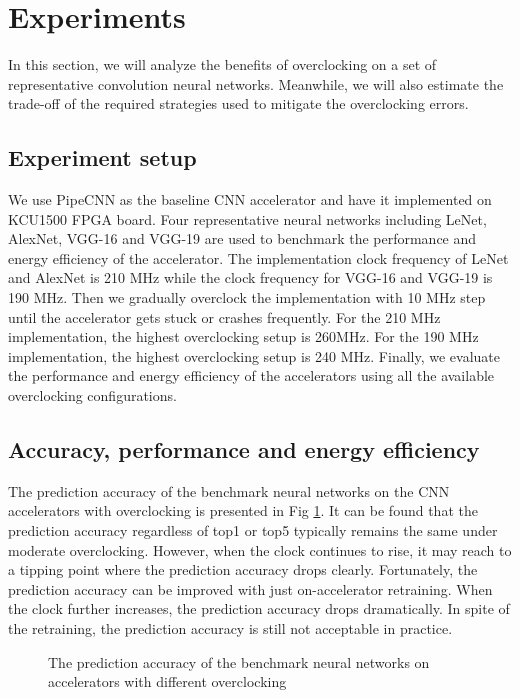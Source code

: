 \section{Experiments}
In this section, we will analyze the benefits of 
overclocking on a set of representative convolution neural networks.
Meanwhile, we will also estimate the trade-off of the required strategies 
used to mitigate the overclocking errors.

\subsection{Experiment setup}
We use PipeCNN as the baseline CNN accelerator and have it implemented on KCU1500 FPGA board.
Four representative neural networks including LeNet, AlexNet, VGG-16 and VGG-19 are used to 
benchmark the performance and energy efficiency of the accelerator. The implementation clock
frequency of LeNet and AlexNet is 210 MHz while the clock frequency for VGG-16 and VGG-19 is 190 MHz.
Then we gradually overclock the implementation with 10 MHz step until the accelerator gets 
stuck or crashes frequently. For the 210 MHz implementation, the highest overclocking setup is 
260MHz. For the 190 MHz implementation, the highest overclocking setup is 240 MHz.
Finally, we evaluate the performance and energy efficiency of the accelerators using 
all the available overclocking configurations.

\subsection{Accuracy, performance and energy efficiency}
The prediction accuracy of the benchmark neural networks on the CNN accelerators with overclocking is 
presented in Fig \ref{fig:overclock-accuracy}. It can be found that the prediction accuracy 
regardless of top1 or top5 typically remains the same under moderate overclocking. However, when the clock 
continues to rise, it may reach to a tipping point where the prediction accuracy drops clearly. 
Fortunately, the prediction accuracy can be improved with just on-accelerator retraining.
When the clock further increases, the prediction accuracy drops dramatically. In spite of the retraining, 
the prediction accuracy is still not acceptable in practice. 

\begin{figure}
        \center
	\qquad
	\qquad
        \qquad
	\caption{The prediction accuracy of the benchmark neural networks on accelerators with different overclocking}
        \label{fig:overclock-accuracy}
\end{figure}

